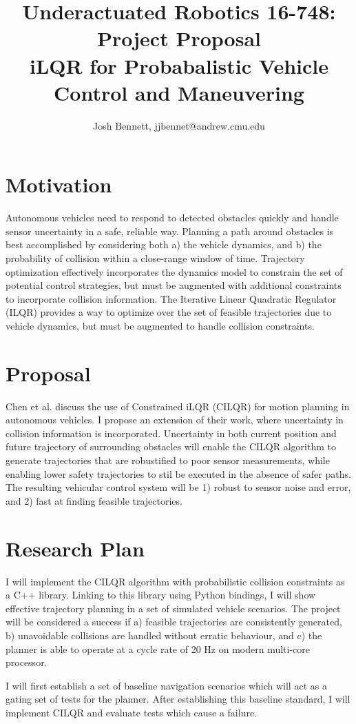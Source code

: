 \documentclass{article}
\theoremstyle{remark}
\theoremstyle{definition}
\begin{document}
\title{Underactuated Robotics 16-748: Project Proposal \\ iLQR for Probabalistic Vehicle Control and Maneuvering}
\author{\Large Josh Bennett, jjbennet@andrew.cmu.edu}
\maketitle

\section{Motivation}

Autonomous vehicles need to respond to detected obstacles quickly and handle sensor uncertainty in a safe, reliable way. Planning a path around obstacles is best accomplished by considering both a) the vehicle dynamics, and b) the probability of collision within a close-range window of time. Trajectory optimization effectively incorporates the dynamics model to constrain the set of potential control strategies, but must be augmented with additional constraints to incorporate collision information. The Iterative Linear Quadratic Regulator (ILQR) provides a way to optimize over the set of feasible trajectories due to vehicle dynamics, but must be augmented to handle collision constraints.

\section{Proposal}

Chen et al. \cite{chen_zhan_tomizuka_2017} discuss the use of Constrained iLQR (CILQR) for motion planning in autonomous vehicles. I propose an extension of their work, where uncertainty in collision information is incorporated. Uncertainty in both current position and future trajectory of surrounding obstacles will enable the CILQR algorithm to generate trajectories that are robustified to poor sensor measurements, while enabling lower safety trajectories to stil be executed in the absence of safer paths. The resulting vehicular control system will be 1) robust to sensor noise and error, and 2) fast at finding feasible trajectories.

\section{Research Plan}

I will implement the CILQR algorithm with probabilistic collision constraints as a C++ library. Linking to this library using Python bindings, I will show effective trajectory planning in a set of simulated vehicle scenarios. The project will be considered a success if a) feasible trajectories are consistently generated, b) unavoidable collisions are handled without erratic behaviour, and c) the planner is able to operate at a cycle rate of 20 Hz on modern multi-core processor.

I will first establish a set of baseline navigation scenarios which will act as a gating set of tests for the planner. After establishing this baseline standard, I will implement CILQR and evaluate tests which cause a failure.



\small
\end{document}
